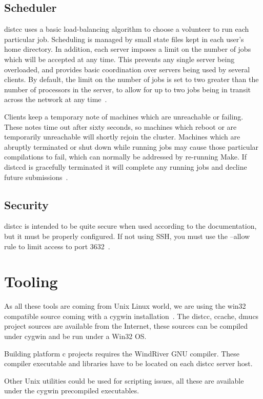 \documentclass{article}
\begin{document}
\subsection{Scheduler}
distcc uses a basic load-balancing algorithm to choose a volunteer to run each
particular job. Scheduling is managed by small state files kept in each user's
home directory. In addition, each server imposes a limit on the number of jobs
which will be accepted at any time. This prevents any single server being
overloaded, and provides basic coordination over servers being used by several
clients. By default, the limit on the number of jobs is set to two greater than
the number of processors in the server, to allow for up to two jobs being in
transit across the network at any time~\cite{lca2004}.

Clients keep a temporary note of machines which are unreachable or failing.
These notes time out after sixty seconds, so machines which reboot or are
temporarily unreachable will shortly rejoin the cluster. Machines which are
abruptly terminated or shut down while running jobs may cause those particular
compilations to fail, which can normally be addressed by re-running Make. If
distccd is gracefully terminated it will complete any running jobs and decline
future submissions~\cite{lca2004}.

\subsection{Security}
distcc is intended to be quite secure when used according to the documentation,
but it must be properly configured. If not using SSH, you must use the
--allow rule to limit access to port 3632~\cite{distcc-gg}.

\section{Tooling}
As all these tools are coming from Unix Linux world, we are using the win32
compatible source coming with a cygwin installation~\cite{cygwin}. 
The distcc, ccache, dmucs project sources are available from the Internet, these sources can be compiled under cygwin and be run under a Win32 OS.

Building platform c projects requires the WindRiver GNU compiler. These
compiler executable and libraries have to be located on each distcc server host.

Other Unix utilities could be used for scripting issues, all these are available
under the cygwin precompiled executables.
\end{document}
